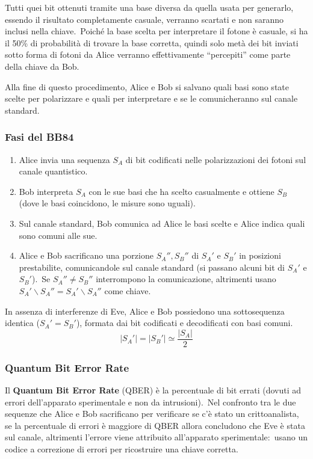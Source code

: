 Tutti quei bit ottenuti tramite una base diversa da quella usata per generarlo, essendo il risultato completamente casuale, verranno scartati e non saranno inclusi nella chiave.\
Poiché la base scelta per interpretare il fotone è casuale, si ha il 50\% di probabilità di trovare la base corretta, quindi solo metà dei bit inviati sotto forma di fotoni da Alice verranno effettivamente ``percepiti'' come parte della chiave da Bob.\

Alla fine di questo procedimento, Alice e Bob si salvano quali basi sono state scelte per polarizzare e quali per interpretare e se le comunicheranno sul canale standard.\

\subsubsection{Fasi del BB84}

\begin{enumerate}
    \item Alice invia una sequenza $S_A$ di bit codificati nelle polarizzazioni dei fotoni sul canale quantistico.
    \item Bob interpreta $S_A$ con le sue basi che ha scelto casualmente e ottiene $S_B$ (dove le basi coincidono, le misure sono uguali).
    \item Sul canale standard, Bob comunica ad Alice le basi scelte e Alice indica quali sono comuni alle sue.
    \item Alice e Bob sacrificano una porzione $S_A'', S_B''$ di $S_A'$ e $S_B'$ in posizioni prestabilite, comunicandole sul canale standard (si passano alcuni bit di $S_A'$ e $S_B'$).\ Se $S_A'' \neq S_B''$ interrompono la comunicazione, altrimenti usano $S_A' \backslash S_A'' = S_A' \backslash S_A''$ come chiave.
\end{enumerate}

\noindent In assenza di interferenze di Eve, Alice e Bob possiedono una sottosequenza identica ($S_A' = S_B'$), formata dai bit codificati e decodificati con basi comuni.\
\[|S_A'| = |S_B'| \simeq \frac{|S_A|}{2}\]

\subsubsection{Quantum Bit Error Rate}

Il \textbf{Quantum Bit Error Rate} (QBER) è la percentuale di bit errati (dovuti ad errori dell'apparato sperimentale e non da intrusioni).\
Nel confronto tra le due sequenze che Alice e Bob sacrificano per verificare se c'è stato un crittoanalista, se la percentuale di errori è maggiore di QBER allora concludono che Eve è stata sul canale, altrimenti l'errore viene attribuito all'apparato sperimentale:\ usano un codice a correzione di errori per ricostruire una chiave corretta.\


